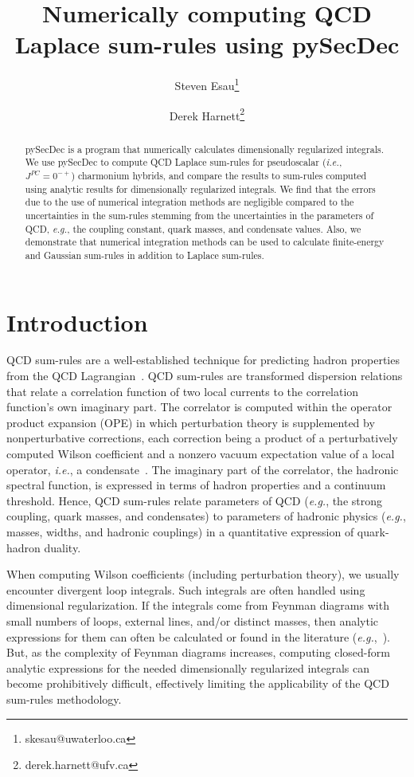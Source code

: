 \documentclass[12pt, letterpaper]{article}
\title{Numerically computing QCD Laplace sum-rules using pySecDec}
\author[1]{Steven Esau\footnote{skesau@uwaterloo.ca}}
\author[1]{Derek Harnett\footnote{derek.harnett@ufv.ca}}
\affil[1]{Department of Physics\\ University of the Fraser Valley\\ Abbotsford, BC, V2S 7M8, Canada
}
\newcommand{\ie}{\textit{i.e.}}
\newcommand{\eg}{\textit{e.g.}}
\newcommand{\add}[1]{#1}
\begin{document}
\maketitle
\begin{abstract}
pySecDec is a program that numerically calculates dimensionally regularized integrals. 
We use pySecDec to compute QCD Laplace sum-rules for pseudoscalar (\ie, $J^{PC}=0^{-+}$) 
charmonium hybrids, and compare the results to sum-rules computed using analytic results
for dimensionally regularized integrals.
We find that the errors due to
the use of numerical integration methods 
are negligible compared to the uncertainties in the sum-rules 
stemming from the uncertainties in the parameters of QCD, 
\eg, the coupling constant, quark masses, and condensate values.
\add{Also, we demonstrate that numerical integration 
methods can be used 
to calculate finite-energy and Gaussian sum-rules in addition 
to Laplace sum-rules.}
\end{abstract}

\section{Introduction}
%
QCD sum-rules
are a well-established technique for predicting hadron properties from the 
QCD Lagrangian~\cite{Shifman:1978by,Shifman:1978bx,Reinders:1984sr,Narison:2007spatmp}.
QCD sum-rules are transformed dispersion relations that relate a correlation function 
of two local currents to the correlation function's own imaginary part.
The correlator is computed within the operator product expansion (OPE)
in which perturbation theory is supplemented by nonperturbative corrections, each
correction being a product of a perturbatively computed Wilson coefficient
and a nonzero vacuum expectation value of a local operator, 
\ie, a condensate~\cite{Wilson:1969zs}.
The imaginary part of the correlator, the hadronic spectral function, is 
expressed in terms of hadron properties and a continuum threshold.
Hence, QCD sum-rules relate parameters of QCD (\eg, the strong coupling, quark
masses, and condensates) to parameters of hadronic physics (\eg, masses, widths, 
and hadronic couplings)
in a quantitative expression of quark-hadron duality.

When computing Wilson coefficients (including perturbation theory), 
we usually encounter divergent loop integrals.
Such integrals are often handled using dimensional regularization.
If the integrals come from Feynman diagrams with 
small numbers of loops, external lines, and/or distinct masses, then analytic expressions
for them can often be calculated or found in the literature 
(\eg,~\cite{PascualTarrach1984,BoosDavydychev1991,Davydychev:1990cq,BroadhurstFleischerTarasov1993}).
But, as the complexity of Feynman diagrams increases, computing closed-form
analytic expressions for the needed dimensionally regularized integrals can become 
prohibitively difficult, effectively limiting the applicability of the QCD sum-rules
methodology.
\end{document}
